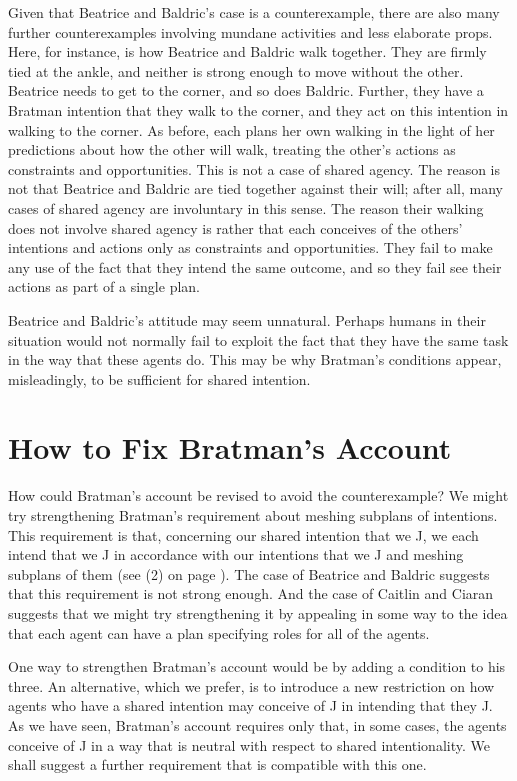\documentclass[12pt,\papersize]{extarticle}
\begin{document}
Given that Beatrice and Baldric's case is a counterexample,
there are also many further counterexamples involving mundane activities and less elaborate props.
Here, for instance, is how Beatrice and Baldric walk together.
They are firmly tied at the ankle, and neither is strong enough to move without the other.
Beatrice needs to get to the corner, and so does Baldric.
Further, they have a Bratman intention that they walk to the corner, and they act on this intention in walking to the corner.
As before, each plans her own walking in the light of her predictions about how the other will walk, treating the other's actions as constraints and opportunities.
This is not a case of shared agency.
The reason is not that Beatrice and Baldric are tied together against their will; 
after all, many cases of shared agency are involuntary in this sense.
The reason their walking does not involve shared agency 
is rather that each conceives of the others' intentions and actions only as constraints and opportunities.
They fail to make any use of the fact that they intend the same outcome,
 and so they fail see their actions as part of a single plan.

Beatrice and Baldric's attitude may seem unnatural. 
Perhaps humans in their situation would not normally fail to exploit the fact that they have the same task in the way that these agents do.
This may be why Bratman's conditions appear, misleadingly, to be sufficient for shared intention.



\section{How to Fix Bratman's Account}
\label{sec:fix}

How could Bratman's account be revised to avoid the counterexample?
We might try strengthening Bratman's requirement about meshing subplans of intentions.
This requirement is that, concerning our shared intention that we J, we each intend that we J in accordance with our intentions that we J and meshing subplans of them (see (2) on page \pageref{quote:bratman_account}).
The case of Beatrice and Baldric suggests that this requirement is not strong enough.
And the case of Caitlin and Ciaran suggests that we might try strengthening it by appealing in some way to the idea that each agent can have a plan specifying roles for all of the agents.

One way to strengthen Bratman's account would be by adding a condition to his three.
An alternative, which we prefer, is to introduce a new restriction on how agents who have a shared intention may conceive of J in intending that they J.
As we have seen, Bratman's account requires only that, in some cases, the agents conceive of J in a way that is neutral with respect to shared intentionality.
We shall suggest a further requirement that is compatible with this one.
\end{document}
